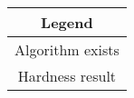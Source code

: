 \renewcommand{\arraystretch}{1.5}
\begin{tabular}{|c|}
	\hline

    Legend\\

    \hline

    \cellcolor{skyblue} Algorithm exists\\

    \hline

	\cellcolor{lightgray} Hardness result\\

	\hline
\end{tabular}
\renewcommand{\arraystretch}{1.0}